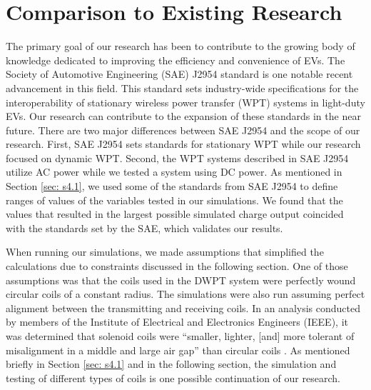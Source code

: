 \section{Comparison to Existing Research}
The primary goal of our research has been to contribute to the growing body of knowledge dedicated to improving 
the efficiency and convenience of EVs. The Society of Automotive Engineering (SAE) J2954 standard is one notable 
recent advancement in this field. This standard sets industry-wide specifications for the interoperability of 
stationary wireless power transfer (WPT) systems in light-duty EVs. Our research can contribute to the expansion 
of these standards in the near future. There are two major differences between SAE J2954 and the scope of our research. 
First, SAE J2954 sets standards for stationary WPT while our research focused on dynamic WPT. 
Second, the WPT systems described in SAE J2954 utilize AC power while we tested a system using DC power. 
As mentioned in Section \ref{sec: s4.1}, we used some of the standards from SAE J2954 to define ranges of values of 
the variables tested in our simulations. We found that the values that resulted in the largest possible simulated 
charge output coincided with the standards set by the SAE, which validates our results. 

When running our simulations, we made assumptions that simplified the calculations due to constraints discussed 
in the following section. One of those assumptions was that the coils used in the DWPT system were perfectly 
wound circular coils of a constant radius. The simulations were also run assuming perfect alignment between the 
transmitting and receiving coils. In an analysis conducted by members of the Institute of Electrical and 
Electronics Engineers (IEEE), it was determined that solenoid coils were “smaller, lighter, [and] more tolerant of 
misalignment in a middle and large air gap” than circular coils \cite{fujita_dynamic_2017}. As mentioned briefly in 
Section \ref{sec: s4.1} and in the following section, the simulation and testing of different types of 
coils is one possible continuation of our research.